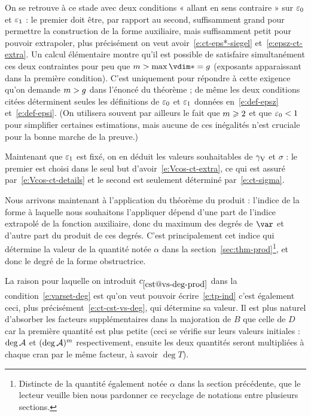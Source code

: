 On se retrouve à ce stade avec deux conditions « allant en sens contraire »
sur \( \varepsilon\sb0 \) et \( \varepsilon\sb1 \) : le premier doit être, par rapport au second,
suffisamment grand pour permettre la construction de la forme auxiliaire, mais
suffisamment petit pour pouvoir extrapoler, plus précisément on veut
avoir~\eqref{e:ct-eps*-siegel} et~\eqref{e:epsz-ct-extra}. Un calcul
élémentaire montre qu'il est possible de satisfaire simultanément ces deux
contraintes pour peu que \( \puiss > \max \vdim* = \genre \) (exposants
apparaissant dans la première condition).  C'est uniquement pour répondre à
cette exigence qu'on demande \( m > g \) dans l'énoncé du théorème ;
de même les deux conditions citées déterminent seules les définitions de \(
  \varepsilon\sb0 \) et \( \varepsilon\sb1 \) données en~\eqref{e:def-epsz} et~\eqref{e:def-epsi}.
(On utilisera souvent par ailleurs le fait que \( m \geqslant 2 \) et que \(
  \varepsilon\sb0 < 1 \) pour simplifier certaines estimations, mais aucune de ces
inégalités n'est cruciale pour la bonne marche de la preuve.)

Maintenant que \( \varepsilon\sb1 \) est fixé, on en déduit les valeurs souhaitables de
\( \gamma \sb{\mathrm{V}} \) et \( \sigma \) : le premier est choisi dans le seul but
d'avoir~\eqref{e:Vcos-ct-extra}, ce qui est assuré
par~\eqref{e:Vcos-ct-details} et le second est seulement déterminé
par~\eqref{e:ct-sigma}.

Nous arrivons maintenant à l'application du théorème du produit : l'indice de
la forme à laquelle nous souhaitons l'appliquer dépend d'une part de l'indice
extrapolé de la fonction auxiliaire, donc du maximum des degrés de \( \var \)
et d'autre part du produit de ces degrés. C'est principalement cet indice qui
détermine la valeur de la quantité notée \( \alpha \) dans la
section~\ref{sec:thm-prod}\footnote{Distincte de la quantité également notée
  \( \alpha \) dans la section précédente, que le lecteur veuille bien nous
  pardonner ce recyclage de notations entre plusieurs sections.}, et donc le
degré de la forme obstructrice.

La raison pour laquelle on introduit \( \cst{vs-deg-prod} \) dans la
condition~\eqref{e:varset-deg} est qu'on veut pouvoir écrire~\eqref{e:tp-ind}
c'est également ceci, plus précisément~\eqref{e:ct-cst-vs-deg}, qui détermine
sa valeur. Il est plus naturel d'absorber
les facteurs supplémentaires dans la majoration de \( B \) que celle de \( D
\) car la première quantité est  plus petite (ceci se vérifie
sur leurs valeurs initiales : \( \deg \mathcal A \) et \( (\deg \mathcal A)^m \)
respectivement, ensuite les deux quantités seront multipliées à chaque cran
par le même facteur, à savoir \( \deg T \)).

